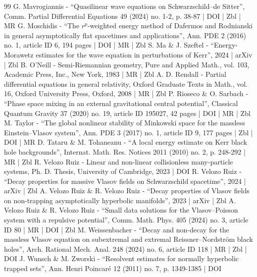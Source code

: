 \begin{thebibliography}{99}
G. Mavrogiannis - “Quasilinear wave equations on Schwarzschild–de Sitter”, Comm. Partial Differential Equations 49 (2024) no. 1-2, p. 38-87 | DOI | Zbl | MR
G. Moschidis - “The $r^p$-weighted energy method of Dafermos and Rodnianski in general asymptotically flat spacetimes and applications”, Ann. PDE 2 (2016) no. 1, article ID 6, 194 pages | DOI | MR | Zbl
S. Ma \& J. Szeftel - “Energy-Morawetz estimates for the wave equation in perturbations of Kerr”, 2024 | arXiv | Zbl
B. O’Neill - Semi-Riemannian geometry, Pure and Applied Math., vol. 103, Academic Press, Inc., New York, 1983 | MR | Zbl
A. D. Rendall - Partial differential equations in general relativity, Oxford Graduate Texts in Math., vol. 16, Oxford University Press, Oxford, 2008 | MR | Zbl
P. Rioseco \& O. Sarbach - “Phase space mixing in an external gravitational central potential”, Classical Quantum Gravity 37 (2020) no. 19, article ID 195027, 42 pages | DOI | MR | Zbl
M. Taylor - “The global nonlinear stability of Minkowski space for the massless Einstein–Vlasov system”, Ann. PDE 3 (2017) no. 1, article ID 9, 177 pages | Zbl | DOI | MR
D. Tataru \& M. Tohaneanu - “A local energy estimate on Kerr black hole backgrounds”, Internat. Math. Res. Notices 2011 (2010) no. 2, p. 248-292 | MR | Zbl
R. Velozo Ruiz - Linear and non-linear collisionless many-particle systems, Ph. D. Thesis, University of Cambridge, 2023 | DOI
R. Velozo Ruiz - “Decay properties for massive Vlasov fields on Schwarzschild spacetime”, 2024 | arXiv | Zbl
A. Velozo Ruiz \& R. Velozo Ruiz - “Decay properties of Vlasov fields on non-trapping asymptotically hyperbolic manifolds”, 2023 | arXiv | Zbl
A. Velozo Ruiz \& R. Velozo Ruiz - “Small data solutions for the Vlasov–Poisson system with a repulsive potential”, Comm. Math. Phys. 405 (2024) no. 3, article ID 80 | MR | DOI | Zbl
M. Weissenbacher - “Decay and non-decay for the massless Vlasov equation on subextremal and extremal Reissner–Nordström black holes”, Arch. Rational Mech. Anal. 248 (2024) no. 6, article ID 118 | MR | Zbl | DOI
J. Wunsch \& M. Zworski - “Resolvent estimates for normally hyperbolic trapped sets”, Ann. Henri Poincaré 12 (2011) no. 7, p. 1349-1385 | DOI
\end{thebibliography}
